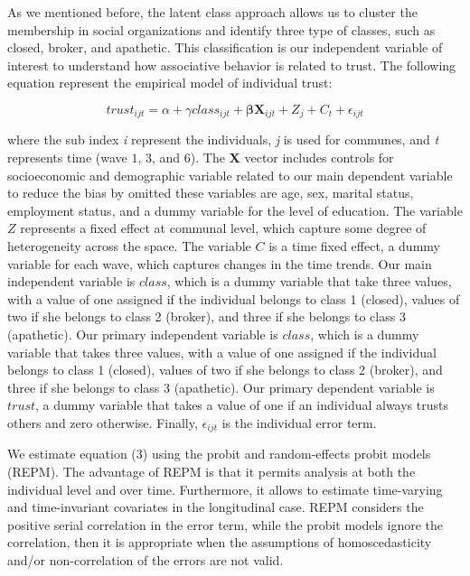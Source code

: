 As we mentioned before, the latent class approach allows us to cluster the membership in social organizations and identify three type of classes, such as closed, broker, and apathetic. This classification is our independent variable of interest to understand how associative behavior is related to trust. The following equation represent the empirical model of individual trust:

\begin{equation}
trust_{ijt} = \alpha + \gamma class_{ijt} + \boldsymbol{\beta} \mathbf{X}_{ijt} + Z_{j} + C_{t} + \epsilon_{ijt}
\end{equation}

where the sub index \textit{i} represent the individuals, \textit{j} is used for communes, and \textit{t} represents time (wave $1$, $3$, and $6$). The \textbf{X} vector includes controls for socioeconomic and demographic variable related to our main dependent variable to reduce the bias by omitted these variables are age, sex, marital status, employment status, and a dummy variable for the level of education. The variable $Z$ represents a fixed effect at communal level, which capture some degree of heterogeneity across the space. The variable $C$ is a time fixed effect, a dummy variable for each wave, which captures changes in the time trends. Our main independent variable is $class$, which is a dummy variable that take three values, with a value of one assigned if the individual belongs to class 1 (closed), values of two if she belongs to class 2 (broker), and three if she belongs to class 3 (apathetic). Our primary independent variable is $class$, which is a dummy variable that takes three values, with a value of one assigned if the individual belongs to class 1 (closed), values of two if she belongs to class 2 (broker), and three if she belongs to class 3 (apathetic). Our primary dependent variable is $trust$, a dummy variable that takes a value of one if an individual always trusts others and zero otherwise. Finally, $\epsilon_{ijt}$ is the individual error term. 
\bigskip

We estimate equation (3) using the probit and random-effects probit models (REPM). The advantage of REPM is that it permits analysis at both the individual level and over time. Furthermore, it allows to estimate time-varying and time-invariant covariates in the longitudinal case. REPM considers the positive serial correlation in the error term, while the probit models ignore the correlation, then it is appropriate when the assumptions of homoscedasticity and/or non-correlation of the errors are not valid.
\bigskip

